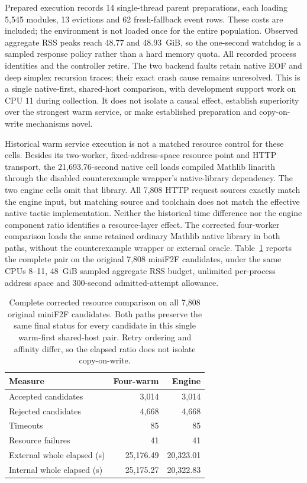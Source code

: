 \documentclass[10pt,twocolumn]{article}
\begin{document}
Prepared execution records 14 single-thread parent preparations, each loading
5,545 modules, 13 evictions and 62 fresh-fallback event rows. These costs are
included; the environment is not loaded once for the entire population.
Observed aggregate RSS peaks reach 48.77 and 48.93~GiB, so the one-second
watchdog is a sampled response policy rather than a hard memory quota.
All recorded process identities and the controller retire. The two backend
faults retain native EOF and deep simplex recursion traces; their exact crash
cause remains unresolved. This is a single native-first, shared-host comparison,
with development support work on CPU 11 during collection. It does not isolate
a causal effect, establish superiority over the strongest warm service,
or make established preparation and copy-on-write mechanisms novel.

Historical warm service execution is not a matched resource control for these
cells. Besides its two-worker, fixed-address-space resource point and HTTP
transport, the 21,693.76-second native cell loads compiled Mathlib linarith
through the disabled counterexample wrapper's native-library dependency.
The two engine cells omit that library. All 7,808 HTTP request sources exactly
match the engine input, but matching source and toolchain does not match the
effective native tactic implementation. Neither the historical time difference
nor the engine component ratio identifies a resource-layer effect.
The corrected four-worker comparison loads the same retained ordinary Mathlib
native library in both paths, without the counterexample wrapper or external
oracle. Table~\ref{tab:corrected-warm-resource} reports the complete pair
on the original 7,808 miniF2F candidates, under the same CPUs 8--11,
48~GiB sampled aggregate RSS budget, unlimited per-process address space
and 300-second admitted-attempt allowance.

\begin{table}[t]
\centering
\small
\begin{tabular}{lrr}
\toprule
Measure & Four-warm & Engine \\
\midrule
Accepted candidates & 3,014 & 3,014 \\
Rejected candidates & 4,668 & 4,668 \\
Timeouts & 85 & 85 \\
Resource failures & 41 & 41 \\
External whole elapsed (s) & 25,176.49 & 20,323.01 \\
Internal whole elapsed (s) & 25,175.27 & 20,322.83 \\
\bottomrule
\end{tabular}
\caption{Complete corrected resource comparison on all 7,808 original miniF2F
candidates. Both paths preserve the same final status for every candidate in
this single warm-first shared-host pair. Retry ordering and affinity differ,
so the elapsed ratio does not isolate copy-on-write.}
\label{tab:corrected-warm-resource}
\end{table}
\end{document}
